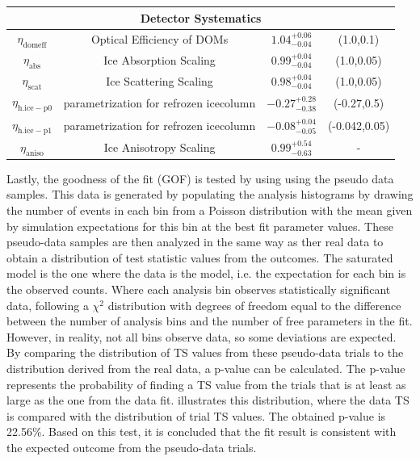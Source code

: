 \begin{table}[h]
{\begin{tabular}{ c c |c|c}
        \multicolumn{4}{c}{\textbf{Detector Systematics}}\\
        \hline
        $\eta_{\mathrm{domeff}}$& Optical Efficiency of DOMs & $1.04_{-0.04}^{+0.06}$ & (1.0,0.1)\\
        \hline
        $\eta_{\mathrm{abs}}$& Ice Absorption Scaling & $0.99_{-0.04}^{+0.04}$ & (1.0,0.05)\\
        \hline
        $\eta_{\mathrm{scat}}$& Ice Scattering Scaling & $0.98_{-0.04}^{+0.04}$ & (1.0,0.05)\\
        \hline
        $\eta_{\mathrm{h.ice-p0}}$& parametrization for refrozen icecolumn & $-0.27_{-0.38}^{+0.28}$ & (-0.27,0.5)\\
        \hline
        $\eta_{\mathrm{h.ice-p1}}$& parametrization for refrozen icecolumn & $-0.08_{-0.05}^{+0.04}$ & (-0.042,0.05)\\
        \hline
        $\eta_{\mathrm{aniso}}$& Ice Anisotropy Scaling & $0.99_{-0.63}^{+0.54}$ & -\\
        \hline
        \hline
    \end{tabular}
    }
\end{table}

Lastly, the goodness of the fit (GOF) is tested by using using the pseudo data samples. This data is generated by populating the analysis histograms by drawing the number of events in each bin from a Poisson distribution with the mean given by  simulation expectations for this bin at the best fit parameter values. These pseudo-data samples are then analyzed in the same way as ther real data to obtain a distribution of test statistic values from the outcomes. The saturated model is the one where the data is the model, i.e. the expectation for each bin is the observed counts. Where each analysis bin observes statistically significant data, following a $\chi^2$ distribution with degrees of freedom equal to the difference between the number of analysis bins and the number of free parameters in the fit. However, in reality, not all bins observe data, so some deviations are expected. By comparing the distribution of TS values from these pseudo-data trials to the distribution derived from the real data, a p-value can be calculated. The p-value represents the probability of finding a TS value from the trials that is at least as large as the one from the data fit.  illustrates this distribution, where the data TS is compared with the distribution of trial TS values. The obtained p-value is 22.56\%. Based on this test, it is concluded that the fit result is consistent with the expected outcome from the pseudo-data trials.


